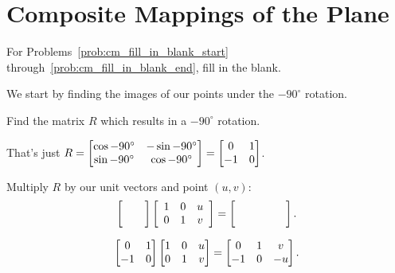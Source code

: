 \documentclass[../gatm_answers.tex]{subfiles}
\begin{document}
\section{Composite Mappings of the Plane}

\newcommand{\blanktwomat}{\twomat{\phantom{0}}{\phantom{0}}{}{}}

\begin{outer_problem}[start=1]
\item For Problems~\ref{prob:cm_fill_in_blank_start} through~\ref{prob:cm_fill_in_blank_end}, fill in the blank.
\end{outer_problem}

\begin{inner_problem}[start=1]
\item We start by finding the images of our points under the $-90^\circ$ rotation. \label{prob:cm_fill_in_blank_start}
\end{inner_problem}

\begin{iinner_problem}[start=1]
\item Find the matrix $R$ which results in a $-90^\circ$ rotation.
\end{iinner_problem}

That's just $R=\begin{bmatrix} \cos -90^\circ & -\sin -90^\circ \\ \sin -90^\circ & \cos -90^\circ \end{bmatrix}=\begin{bmatrix} 0 & 1 \\ -1 & 0 \end{bmatrix}$.

\begin{iinner_problem}
\item  \label{prob:intermediate_result_matrix} Multiply $R$ by our unit vectors and point $(u,v)$: $$\blanktwomat\left[\begin{array}{ccc} 1 & 0 & u \\ 0 & 1 & v \end{array}\right] = \left[\phantom{\begin{array}{ccc} 1 & 0 & u \\ 0 & 1 & v \end{array}}\right].$$
\end{iinner_problem}

$$\begin{bmatrix} 0 & 1 \\ -1 & 0 \end{bmatrix}\begin{bmatrix} 1 & 0 & u \\ 0 & 1 & v \end{bmatrix} = \begin{bmatrix}0 & 1 & v \\ -1 & 0 & -u \\ \end{bmatrix}.$$
\end{document}
